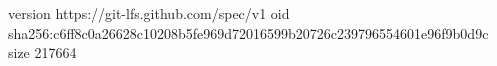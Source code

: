 version https://git-lfs.github.com/spec/v1
oid sha256:c6ff8c0a26628c10208b5fe969d72016599b20726c239796554601e96f9b0d9c
size 217664
